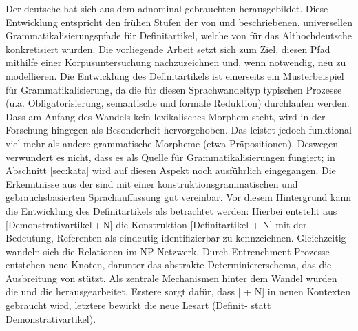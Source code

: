 Der deutsche  hat sich aus dem adnominal gebrauchten   herausgebildet. Diese Entwicklung entspricht den frühen Stufen der von \textcite{Greenberg1978} und \textcite{Lehmann2015} beschriebenen, universellen Grammatikalisierungspfade  für Definitartikel, welche von \textcite{Schmuck2014} für das Althochdeutsche konkretisiert wurden. Die vorliegende Arbeit setzt sich zum Ziel, diesen Pfad mithilfe einer Korpusuntersuchung nachzuzeichnen und, wenn notwendig, neu zu modellieren. Die Entwicklung  des Definitartikels ist einerseits ein Musterbeispiel für Grammatikalisierung, da die für diesen Sprachwandeltyp typischen Prozesse (u.a. Obligatorisierung, semantische und formale Reduktion)  durchlaufen werden. Dass am Anfang des Wandels kein lexikalisches Morphem steht, wird in der Forschung hingegen als Besonderheit hervorgehoben. Das  leistet jedoch funktional viel mehr als andere grammatische Morpheme (etwa Präpositionen). Deswegen verwundert es nicht, dass es als Quelle für Grammatikalisierungen fungiert; in Abschnitt \ref{sec:kata} wird auf diesen Aspekt noch ausführlich eingegangen. Die Erkenntnisse aus der  sind mit einer konstruktionsgrammatischen und gebrauchsbasierten Sprachauffassung gut vereinbar. Vor diesem Hintergrund kann die Entwicklung des Definitartikels als  betrachtet werden: Hierbei entsteht aus [Demonstrativartikel\,+\,N] die Konstruktion   [Definitartikel + N] mit der Bedeutung, Referenten als eindeutig identifizierbar zu kennzeichnen. Gleichzeitig wandeln sich die Relationen im NP-Netzwerk. Durch Entrenchment-Prozesse entstehen neue Knoten, darunter das abstrakte Determiniererschema, das die Ausbreitung von  stützt. Als zentrale Mechanismen hinter dem Wandel wurden die  und die  herausgearbeitet. Erstere sorgt dafür, dass [ + N] in neuen Kontexten gebraucht wird, letztere bewirkt die neue Lesart (Definit- statt Demonstrativartikel). 
